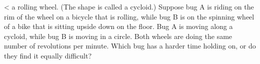  <%
a rolling wheel. (The shape is called a cycloid.) Suppose
bug A is riding on the rim of the wheel on a bicycle that is
rolling, while bug B is on the spinning wheel of a bike
that is sitting upside down on the floor. Bug A is moving
along a cycloid, while bug B is moving in a circle. Both
wheels are doing the same number of revolutions per minute.
Which bug has a harder time holding on, or do they find
it equally difficult?
